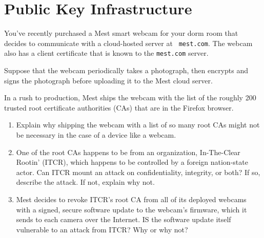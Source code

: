 \newpage
\section{Public Key Infrastructure}

You've recently purchased a Mest smart webcam for your
dorm room that decides to communicate with a cloud-hosted server at {\tt
  mest.com}. The webcam also has a client certificate that is known
to the {\tt mest.com} server. 

Suppose that the webcam periodically takes a photograph, then encrypts
and signs the photograph before uploading it to the Mest cloud server.

In a rush to production, Mest ships the webcam with the list of
the roughly 200 trusted root certificate authorities (CAs) that are in the
Firefox browser.

\begin{enumerate}
\item Explain why shipping the webcam with a list of so many root
  CAs might not be necessary in the case of a device like a webcam.


\item One of the root CAs happens to be from an organization,
  In-The-Clear Rootin' (ITCR), which happens to be controlled by a
  foreign nation-state actor.  Can ITCR mount an attack on
  confidentiality, integrity, or both?  If so, describe the attack. If
  not, explain why not.


\item Mest decides to revoke ITCR's root CA from all of its deployed
  webcams with a signed, secure software update to the webcam's
  firmware, which it sends to each camera over the Internet. IS the
  software update itself vulnerable to an attack from ITCR? Why or why
  not? 


\end{enumerate}
\eprob


